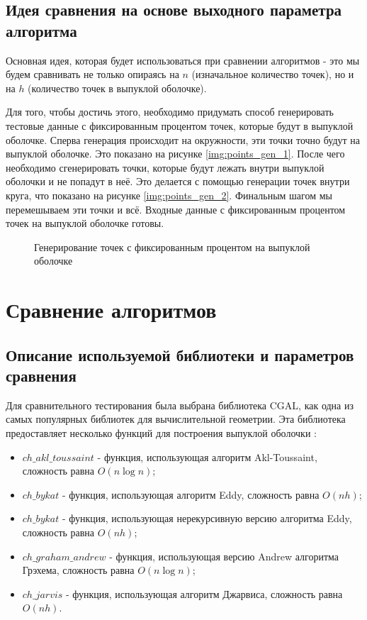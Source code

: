 \subsection{Идея сравнения на основе выходного параметра алгоритма}

Основная идея, которая будет использоваться при сравнении алгоритмов - это мы будем сравнивать не только опираясь на $n$ (изначальное количество точек), но и на $h$ (количество точек в выпуклой оболочке).

Для того, чтобы достичь этого, необходимо придумать способ генерировать тестовые данные с фиксированным процентом точек, которые будут в выпуклой оболочке. Сперва генерация происходит на окружности, эти точки точно будут на выпуклой оболочке. Это показано на рисунке \ref{img:points_gen_1}. После чего необходимо сгенерировать точки, которые будут лежать внутри выпуклой оболочки и не попадут в неё. Это делается с помощью генерации точек внутри круга, что показано на рисунке \ref{img:points_gen_2}. Финальным шагом мы перемешываем эти точки и всё. Входные данные с фиксированным процентом точек на выпуклой оболочке готовы.

\begin{figure}[H]
	{\centering
		\hfill
		\subbottom[\label{img:points_gen_1}]{%
			}
		\hfill
		\subbottom[\label{img:points_gen_2}]{%
			}
		\hfill
	}
	\caption{Генерирование точек с фиксированным процентом на выпуклой оболочке}
	\label{img:points_gen}
\end{figure}

\section{Сравнение алгоритмов}

\subsection{Описание используемой библиотеки и параметров сравнения}

Для сравнительного тестирования была выбрана библиотека CGAL, как одна из самых популярных библиотек для вычислительной геометрии. Эта библиотека предоставляет несколько функций для построения выпуклой оболочки \cite{cgalconvexhull}:
\begin{itemize}
	\item $ch\_akl\_toussaint$ - функция, использующая алгоритм Akl-Toussaint\cite{akl1978fast}, сложность равна $O(n \log n)$;
	\item $ch\_bykat$ - функция, использующая алгоритм Eddy\cite{eddy1977new}, сложность равна $O(nh)$;
	\item $ch\_bykat$ - функция, использующая нерекурсивную версию алгоритма Eddy\cite{bykat1978convex}, сложность равна $O(nh)$;
	\item $ch\_graham\_andrew$ - функция, использующая версию Andrew алгоритма Грэхема\cite{andrew1979another}, сложность равна $O(n \log n)$;
	\item $ch\_jarvis$ - функция, использующая алгоритм Джарвиса\cite{jarvis1973Jarvis}, сложность равна $O(nh)$.
\end{itemize}


